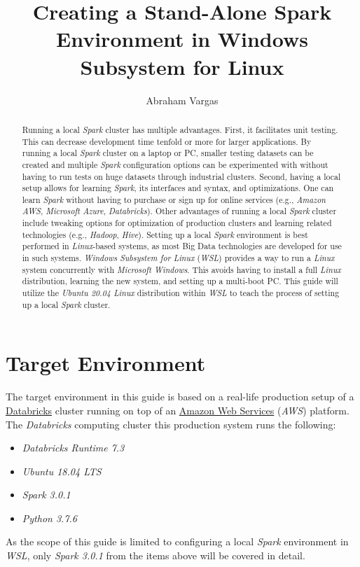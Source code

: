\documentclass{article}
\begin{document}
\title{Creating a Stand-Alone Spark Environment in Windows Subsystem for Linux}
\author{Abraham Vargas}
\date{}
\maketitle

\begin{abstract}
Running a local \emph{Spark} cluster has multiple advantages. First, it facilitates unit testing.
This can decrease development time tenfold or more for larger applications. By running a
local \emph{Spark} cluster on a laptop or PC, smaller testing datasets can be created and multiple
\emph{Spark} configuration options can be experimented with without having to run tests on huge
datasets through industrial clusters. Second, having a local setup allows for learning
\emph{Spark}, its interfaces and syntax, and optimizations. One can learn \emph{Spark} without
having to purchase or sign up for online services (e.g., \emph{Amazon AWS}, \emph{Microsoft Azure},
\emph{Databricks}). Other advantages of running a local \emph{Spark} cluster include tweaking
options for optimization of production clusters and learning related technologies (e.g.,
\emph{Hadoop}, \emph{Hive}). Setting up a local \emph{Spark} environment is best performed in
\emph{Linux}-based systems, as most Big Data technologies are developed for use in such systems.
\emph{Windows Subsystem for Linux} (\emph{WSL}) provides a way to run a \emph{Linux} system
concurrently with \emph{Microsoft Windows}. This avoids having to install a full \emph{Linux}
distribution, learning the new system, and setting up a multi-boot PC. This guide will utilize
the \emph{Ubuntu 20.04 Linux} distribution within \emph{WSL} to teach the process of setting up a
local \emph{Spark} cluster.
\end{abstract}

\newpage
\tableofcontents
\newpage

\section{Target Environment}
The target environment in this guide is based on a real-life production setup of a
\href{https://databricks.com/}{Databricks} cluster running on top of an
\href{https://aws.amazon.com/}{Amazon Web Services} (\emph{AWS}) platform.
The \emph{Databricks} computing cluster this production system runs the following:
\begin{itemize}
  \item \emph{Databricks Runtime 7.3}
  \item \emph{Ubuntu 18.04 LTS}
  \item \emph{Spark 3.0.1}
  \item \emph{Python 3.7.6}
\end{itemize}
As the scope of this guide is limited to configuring a local \emph{Spark} environment in
\emph{WSL}, only \emph{Spark 3.0.1} from the items above will be covered in detail.
\end{document}
